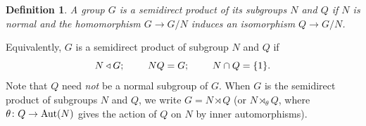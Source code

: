 \documentclass[a4paper,11pt,final]{memoir}%
\newtheorem{definition}[X]{Definition}
\theoremstyle{nonumberplain}
\begin{document}
\begin{definition}
\label{it13} A group $G$ is a \emph{semidirect product\/}%
of its subgroups $N$ and $Q$ if $N$ is normal and the homomorphism
$G\rightarrow G/N$ induces an isomorphism $Q\rightarrow G/N$.
\end{definition}

Equivalently, $G$ is a semidirect product of subgroup $N$ and $Q$ if
\begin{equation}
N\triangleleft G\text{; \hspace{0.3in}}NQ=G\text{;\hspace{0.3in} }N\cap
Q=\{1\}. \label{e33}%
\end{equation}
Note that $Q$ need \textit{not\/} be a normal subgroup of $G$. When $G$ is the
semidirect product of subgroups $N$ and $Q$, we write $G=N\rtimes Q$ (or
$N\rtimes_{\theta}Q$, where $\theta\colon Q\rightarrow\operatorname{Aut}(N)$ gives the
action of $Q$ on $N$ by inner automorphisms).
\end{document}
